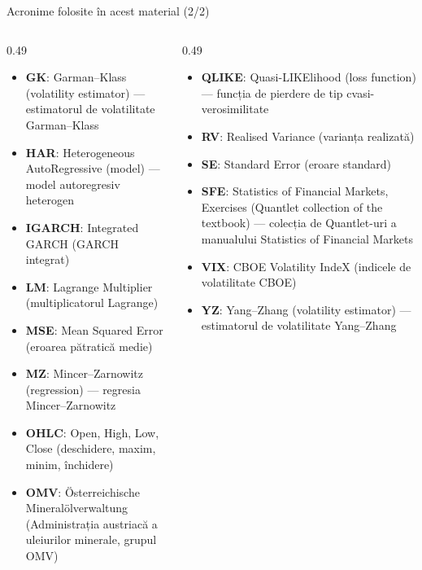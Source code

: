 \begin{frame}{Acronime folosite în acest material (2/2)}
\begin{columns}[T]
\begin{column}{0.49\textwidth}
\begin{itemize}\setlength{\itemsep}{0pt}
    \item \textbf{GK}: Garman–Klass (volatility estimator) — estimatorul de volatilitate Garman–Klass
    \item \textbf{HAR}: Heterogeneous AutoRegressive (model) — model autoregresiv heterogen
    \item \textbf{IGARCH}: Integrated GARCH (GARCH integrat)
    \item \textbf{LM}: Lagrange Multiplier (multiplicatorul Lagrange)
    \item \textbf{MSE}: Mean Squared Error (eroarea pătratică medie)
    \item \textbf{MZ}: Mincer–Zarnowitz (regression) — regresia Mincer–Zarnowitz
    \item \textbf{OHLC}: Open, High, Low, Close (deschidere, maxim, minim, închidere)
    \item \textbf{OMV}: Österreichische Mineralölverwaltung (Administrația austriacă a uleiurilor minerale, grupul OMV)
\end{itemize}
\end{column}
\begin{column}{0.49\textwidth}
\begin{itemize}\setlength{\itemsep}{0pt}
    \item \textbf{QLIKE}: Quasi-LIKElihood (loss function) — funcția de pierdere de tip cvasi-verosimilitate
    \item \textbf{RV}: Realised Variance (varianța realizată)
    \item \textbf{SE}: Standard Error (eroare standard)
    \item \textbf{SFE}: Statistics of Financial Markets, Exercises (Quantlet collection of the textbook) — colecția de Quantlet-uri a manualului Statistics of Financial Markets
    \item \textbf{VIX}: CBOE Volatility IndeX (indicele de volatilitate CBOE)
    \item \textbf{YZ}: Yang–Zhang (volatility estimator) — estimatorul de volatilitate Yang–Zhang
\end{itemize}
\end{column}
\end{columns}
\end{frame}

